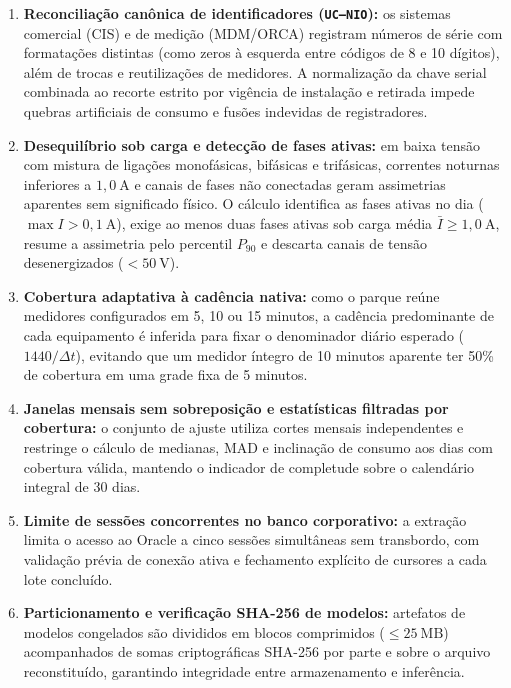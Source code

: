 \begin{enumerate}
\item \textbf{Reconciliação canônica de identificadores (\texttt{UC--NIO}):} os sistemas comercial (CIS) e de medição (MDM/ORCA) registram números de série com formatações distintas (como zeros à esquerda entre códigos de 8 e 10 dígitos), além de trocas e reutilizações de medidores. A normalização da chave serial combinada ao recorte estrito por vigência de instalação e retirada impede quebras artificiais de consumo e fusões indevidas de registradores.

\item \textbf{Desequilíbrio sob carga e detecção de fases ativas:} em baixa tensão com mistura de ligações monofásicas, bifásicas e trifásicas, correntes noturnas inferiores a $1{,}0\ \mathrm{A}$ e canais de fases não conectadas geram assimetrias aparentes sem significado físico. O cálculo identifica as fases ativas no dia ($\max I > 0{,}1\ \mathrm{A}$), exige ao menos duas fases ativas sob carga média $\bar{I} \ge 1{,}0\ \mathrm{A}$, resume a assimetria pelo percentil $P_{90}$ e descarta canais de tensão desenergizados ($< 50\ \mathrm{V}$).

\item \textbf{Cobertura adaptativa à cadência nativa:} como o parque reúne medidores configurados em 5, 10 ou 15 minutos, a cadência predominante de cada equipamento é inferida para fixar o denominador diário esperado ($1440 / \Delta t$), evitando que um medidor íntegro de 10 minutos aparente ter 50\% de cobertura em uma grade fixa de 5 minutos.

\item \textbf{Janelas mensais sem sobreposição e estatísticas filtradas por cobertura:} o conjunto de ajuste utiliza cortes mensais independentes e restringe o cálculo de medianas, MAD e inclinação de consumo aos dias com cobertura válida, mantendo o indicador de completude sobre o calendário integral de 30 dias.

\item \textbf{Limite de sessões concorrentes no banco corporativo:} a extração limita o acesso ao Oracle a cinco sessões simultâneas sem transbordo, com validação prévia de conexão ativa e fechamento explícito de cursores a cada lote concluído.

\item \textbf{Particionamento e verificação SHA-256 de modelos:} artefatos de modelos congelados são divididos em blocos comprimidos ($\le 25\ \mathrm{MB}$) acompanhados de somas criptográficas SHA-256 por parte e sobre o arquivo reconstituído, garantindo integridade entre armazenamento e inferência.
\end{enumerate}
